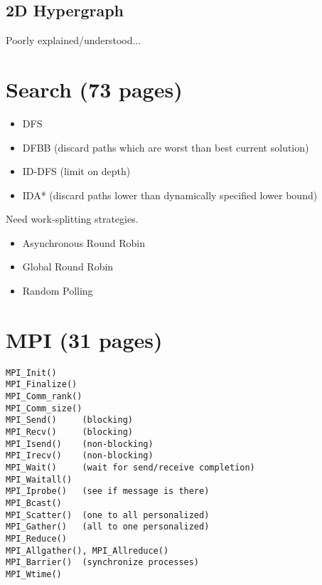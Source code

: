 \documentclass[a4paper,10pt]{article}
\begin{document}
\subsection{2D Hypergraph}
Poorly explained/understood...

\section{Search (73 pages)}
\begin{itemize}
\item DFS
\item DFBB (discard paths which are worst than best current solution)
\item ID-DFS (limit on depth)
\item IDA* (discard paths lower than dynamically specified lower bound)
\end{itemize}
Need work-splitting strategies.
\begin{itemize}
\item Asynchronous Round Robin
\item Global Round Robin
\item Random Polling
\end{itemize}

\section{MPI (31 pages)}
\begin{verbatim}
MPI_Init()
MPI_Finalize()
MPI_Comm_rank()
MPI_Comm_size()
MPI_Send()     (blocking)
MPI_Recv()     (blocking)
MPI_Isend()    (non-blocking)
MPI_Irecv()    (non-blocking)
MPI_Wait()     (wait for send/receive completion)
MPI_Waitall()
MPI_Iprobe()   (see if message is there)
MPI_Bcast()
MPI_Scatter()  (one to all personalized)
MPI_Gather()   (all to one personalized)
MPI_Reduce()
MPI_Allgather(), MPI_Allreduce()
MPI_Barrier()  (synchronize processes)
MPI_Wtime()
\end{verbatim}
\end{document}
